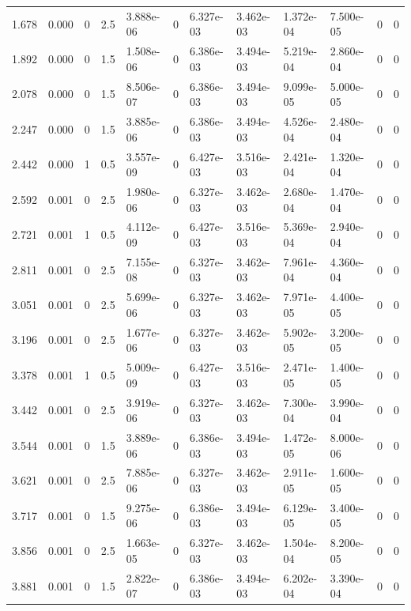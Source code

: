 \documentclass[preview]{standalone}
\begin{document}
{{\begin{tabular}{L{1.2cm}C{1.2cm} C{0.3cm}C{0.5cm} C{1.4cm}C{1.4cm} C{1.4cm}C{1.4cm} C{1.6cm}C{1.6cm} C{1.6cm}C{1.6cm}}
  1.678  &  0.000  & 0     & 2.5 &  3.888e-06  & 0  &  6.327e-03&   3.462e-03& 1.372e-04 & 7.500e-05   &  0 & 0  \\ 
  1.892  &  0.000  & 0     & 1.5 &  1.508e-06  & 0  &  6.386e-03&   3.494e-03& 5.219e-04 & 2.860e-04   &  0 & 0  \\ 
  2.078  &  0.000  & 0     & 1.5 &  8.506e-07  & 0  &  6.386e-03&   3.494e-03& 9.099e-05 & 5.000e-05   &  0 & 0  \\ 
  2.247  &  0.000  & 0     & 1.5 &  3.885e-06  & 0  &  6.386e-03&   3.494e-03& 4.526e-04 & 2.480e-04   &  0 & 0  \\ 
  2.442  &  0.000  & 1     & 0.5 &  3.557e-09  & 0  &  6.427e-03&   3.516e-03& 2.421e-04 & 1.320e-04   &  0 & 0  \\ 
  2.592  &  0.001  & 0     & 2.5 &  1.980e-06  & 0  &  6.327e-03&   3.462e-03& 2.680e-04 & 1.470e-04   &  0 & 0  \\ 
  2.721  &  0.001  & 1     & 0.5 &  4.112e-09  & 0  &  6.427e-03&   3.516e-03& 5.369e-04 & 2.940e-04   &  0 & 0  \\ 
  2.811  &  0.001  & 0     & 2.5 &  7.155e-08  & 0  &  6.327e-03&   3.462e-03& 7.961e-04 & 4.360e-04   &  0 & 0  \\ 
  3.051  &  0.001  & 0     & 2.5 &  5.699e-06  & 0  &  6.327e-03&   3.462e-03& 7.971e-05 & 4.400e-05   &  0 & 0  \\ 
  3.196  &  0.001  & 0     & 2.5 &  1.677e-06  & 0  &  6.327e-03&   3.462e-03& 5.902e-05 & 3.200e-05   &  0 & 0  \\ 
  3.378  &  0.001  & 1     & 0.5 &  5.009e-09  & 0  &  6.427e-03&   3.516e-03& 2.471e-05 & 1.400e-05   &  0 & 0  \\ 
  3.442  &  0.001  & 0     & 2.5 &  3.919e-06  & 0  &  6.327e-03&   3.462e-03& 7.300e-04 & 3.990e-04   &  0 & 0  \\ 
  3.544  &  0.001  & 0     & 1.5 &  3.889e-06  & 0  &  6.386e-03&   3.494e-03& 1.472e-05 & 8.000e-06   &  0 & 0  \\ 
  3.621  &  0.001  & 0     & 2.5 &  7.885e-06  & 0  &  6.327e-03&   3.462e-03& 2.911e-05 & 1.600e-05   &  0 & 0  \\ 
  3.717  &  0.001  & 0     & 1.5 &  9.275e-06  & 0  &  6.386e-03&   3.494e-03& 6.129e-05 & 3.400e-05   &  0 & 0  \\ 
  3.856  &  0.001  & 0     & 2.5 &  1.663e-05  & 0  &  6.327e-03&   3.462e-03& 1.504e-04 & 8.200e-05   &  0 & 0  \\ 
  3.881  &  0.001  & 0     & 1.5 &  2.822e-07  & 0  &  6.386e-03&   3.494e-03& 6.202e-04 & 3.390e-04   &  0 & 0  \\ 

\end{tabular}}}
\end{document}
